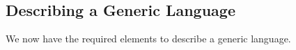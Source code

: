\begin{code}%
\>[0]\AgdaSpace{}%
\AgdaSpace{}%
\AgdaSymbol{(}\AgdaSpace{}%
\AgdaSymbol{:}\AgdaSpace{}%
\AgdaSpace{}%
\AgdaSpace{}%
\AgdaSpace{}%
\AgdaSymbol{)(}\AgdaSpace{}%
\AgdaSymbol{:}\AgdaSpace{}%
\AgdaSymbol{)(}\AgdaSpace{}%
\AgdaSymbol{:}\AgdaSpace{}%
\AgdaSpace{}%
\AgdaSymbol{)}\AgdaSpace{}%
\AgdaSymbol{:}\AgdaSpace{}%
\AgdaSpace{}%
\<%
\\
\>[0][@{}l@{\AgdaIndent{0}}]%
\>[2]%
\>[7]\AgdaSymbol{:}\AgdaSpace{}%
\AgdaSpace{}%
\AgdaSpace{}%
\AgdaSpace{}%
\AgdaSpace{}%
\AgdaSpace{}%
\AgdaSpace{}%
\AgdaSpace{}%
\<%
\\
%
\>[2]%
\>[7]\AgdaSymbol{:}\AgdaSpace{}%
\AgdaSpace{}%
\AgdaSpace{}%
\AgdaSpace{}%
\AgdaSpace{}%
\AgdaSymbol{(}\AgdaSpace{}%
\AgdaSymbol{)}\AgdaSpace{}%
%
\>[43]\AgdaSpace{}%
\AgdaSpace{}%
\AgdaSpace{}%
\AgdaSpace{}%
\<%
\end{code}

\subsection{Describing a Generic Language}

We now have the required elements to describe a generic language.


